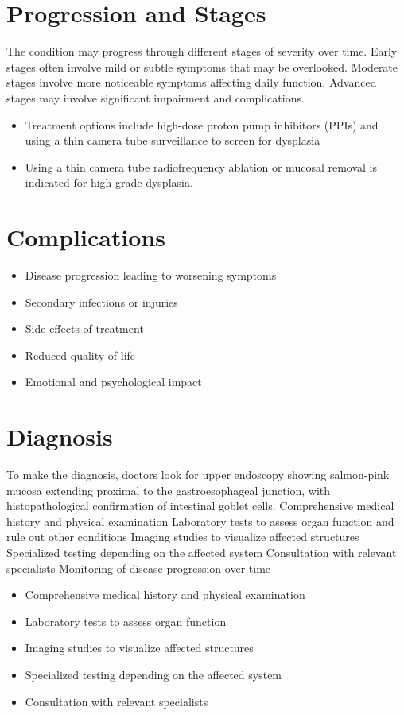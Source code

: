 \section{Progression and Stages}
The condition may progress through different stages of severity over time. Early stages often involve mild or subtle symptoms that may be overlooked. Moderate stages involve more noticeable symptoms affecting daily function. Advanced stages may involve significant impairment and complications.

\begin{itemize}[noitemsep]
  \item Treatment options include high-dose proton pump inhibitors (PPIs) and using a thin camera tube surveillance to screen for dysplasia
  \item Using a thin camera tube radiofrequency ablation or mucosal removal is indicated for high-grade dysplasia.
\end{itemize}
\section{Complications}
\begin{itemize}[noitemsep]
  \item Disease progression leading to worsening symptoms
  \item Secondary infections or injuries
  \item Side effects of treatment
  \item Reduced quality of life
  \item Emotional and psychological impact
\end{itemize}
\section{Diagnosis}
To make the diagnosis, doctors look for upper endoscopy showing salmon-pink mucosa extending proximal to the gastroesophageal junction, with histopathological confirmation of intestinal goblet cells. Comprehensive medical history and physical examination Laboratory tests to assess organ function and rule out other conditions Imaging studies to visualize affected structures Specialized testing depending on the affected system Consultation with relevant specialists Monitoring of disease progression over time

\begin{itemize}[noitemsep]
  \item Comprehensive medical history and physical examination
  \item Laboratory tests to assess organ function
  \item Imaging studies to visualize affected structures
  \item Specialized testing depending on the affected system
  \item Consultation with relevant specialists
\end{itemize}
